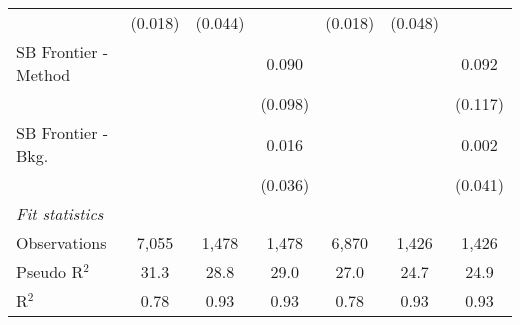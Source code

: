 \begin{tabular}{lcccccc}
                        & (0.018)      & (0.044) &         & (0.018)      & (0.048) &   \\   
   SB Frontier - Method &              &         & 0.090   &              &         & 0.092\\   
                        &              &         & (0.098) &              &         & (0.117)\\   
   SB Frontier - Bkg.   &              &         & 0.016   &              &         & 0.002\\   
                        &              &         & (0.036) &              &         & (0.041)\\   
   \midrule
   \emph{Fit statistics}\\
   Observations         & 7,055        & 1,478   & 1,478   & 6,870        & 1,426   & 1,426\\  
   Pseudo R$^2$         & 31.3         & 28.8    & 29.0    & 27.0         & 24.7    & 24.9\\  
   R$^2$                & 0.78         & 0.93    & 0.93    & 0.78         & 0.93    & 0.93\\  
   

\end{tabular}
